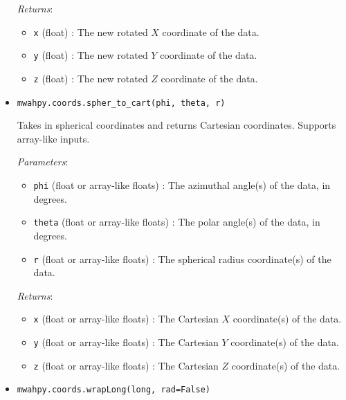 \documentclass{article}
\begin{document}
\begin{itemize}
\begin{itemize}
\end{itemize}

\textit{Returns}: \begin{itemize}

\item \verb!x! (float) : The new rotated $X$ coordinate of the data.

\item \verb!y! (float) : The new rotated $Y$ coordinate of the data.

\item \verb!z! (float) : The new rotated $Z$ coordinate of the data.

\end{itemize}



\item \verb!mwahpy.coords.spher_to_cart(phi, theta, r)!

Takes in spherical coordinates and returns Cartesian coordinates. Supports array-like inputs.

\textit{Parameters}: \begin{itemize}

\item \verb!phi! (float or array-like floats) : The azimuthal angle(s) of the data, in degrees.

\item \verb!theta! (float or array-like floats) : The polar angle(s) of the data, in degrees.

\item \verb!r! (float or array-like floats) : The spherical radius coordinate(s) of the data.

\end{itemize}

\textit{Returns}: \begin{itemize}

\item \verb!x! (float or array-like floats) : The Cartesian $X$ coordinate(s) of the data.

\item \verb!y! (float or array-like floats) : The Cartesian $Y$ coordinate(s) of the data.

\item \verb!z! (float or array-like floats) : The Cartesian $Z$ coordinate(s) of the data.

\end{itemize}



\item \verb!mwahpy.coords.wrapLong(long, rad=False)!


\end{itemize}
\end{document}
